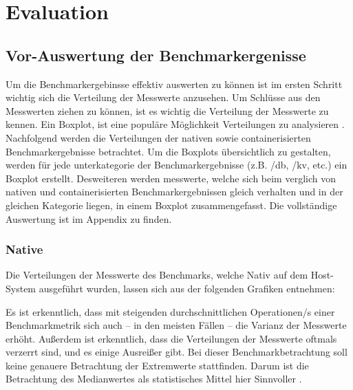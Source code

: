 \chapter{Evaluation}

\section{Vor-Auswertung der Benchmarkergenisse}

Um die Benchmarkergebinsse effektiv auswerten zu können ist im ersten Schritt wichtig sich die Verteilung der Messwerte anzusehen. Um Schlüsse aus den Messwerten ziehen zu können, ist es wichtig die Verteilung der Messwerte zu kennen. Ein Boxplot, ist eine populäre Möglichkeit Verteilungen zu analysieren \cite[Vgl. 1]{majawExploringDataDistributions2023}. Nachfolgend werden die Verteilungen der nativen sowie containerisierten Benchmarkergebnisse betrachtet. Um die Boxplots übersichtlich zu gestalten, werden für jede unterkategorie der Benchmarkergebnisse (z.B. /db, /kv, etc.) ein Boxplot erstellt. Desweiteren werden messwerte, welche sich beim verglich von nativen und containerisierten Benchmarkergebnissen gleich verhalten und in der gleichen Kategorie liegen, in einem Boxplot zusammengefasst. Die vollständige Auswertung ist im Appendix zu finden. 

\subsection{Native}

Die Verteilungen der Messwerte des Benchmarks, welche Nativ auf dem Host-System ausgeführt wurden, lassen sich aus der folgenden Grafiken entnehmen:








\FloatBarrier

Es ist erkenntlich, dass mit steigenden durchschnittlichen Operationen/s einer Benchmarkmetrik sich auch – in den meisten Fällen – die Varianz der Messwerte erhöht. Außerdem ist erkenntlich, dass die Verteilungen der Messwerte oftmals verzerrt sind, und es einige Ausreißer gibt. Bei dieser Benchmarkbetrachtung soll keine genauere Betrachtung der Extremwerte stattfinden. Darum ist die Betrachtung des Medianwertes als statistisches Mittel hier Sinnvoller \cite[Vgl. 15f.]{stengelStatistikUndAufbereitung2011}. 

